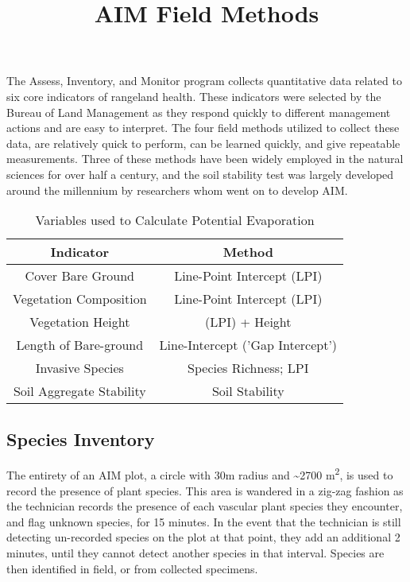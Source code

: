 \documentclass[
]{article}
\title{AIM Field Methods}
\author{}
\date{\vspace{-2.5em}}
\begin{document}
\maketitle

The Assess, Inventory, and Monitor program collects quantitative data
related to six core indicators of rangeland health. These indicators
were selected by the Bureau of Land Management as they respond quickly
to different management actions and are easy to interpret. The four
field methods utilized to collect these data, are relatively quick to
perform, can be learned quickly, and give repeatable measurements. Three
of these methods have been widely employed in the natural sciences for
over half a century, and the soil stability test was largely developed
around the millennium by researchers whom went on to develop AIM.

\begin{wraptable}{l}{90mm}
    \begin{tabular}{c | c}
      \textbf{Indicator} & \textbf{Method}\\ \hline
      Cover Bare Ground & Line-Point Intercept (LPI) \\ \hline
      Vegetation Composition & Line-Point Intercept (LPI) \\ \hline
      Vegetation Height & (LPI) + Height \\ \hline
      Length of Bare-ground & Line-Intercept ('Gap Intercept')  \\ \hline
      Invasive Species & Species Richness; LPI \\ \hline
      Soil Aggregate Stability & Soil Stability \\ \hline
    \end{tabular}
    \caption{Variables used to Calculate Potential Evaporation}
    \label{Potential Evaporation}
\end{wraptable}

\hypertarget{species-inventory}{%
\subsection{Species Inventory}\label{species-inventory}}

The entirety of an AIM plot, a circle with 30m radius and
\textasciitilde2700 m\textsuperscript{2}, is used to record the presence
of plant species. This area is wandered in a zig-zag fashion as the
technician records the presence of each vascular plant species they
encounter, and flag unknown species, for 15 minutes. In the event that
the technician is still detecting un-recorded species on the plot at
that point, they add an additional 2 minutes, until they cannot detect
another species in that interval. Species are then identified in field,
or from collected specimens.
\end{document}
